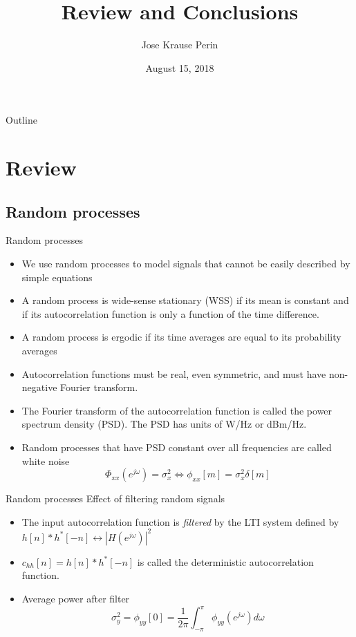 \documentclass[10pt, aspectratio=169]{beamer}
\title[EE 264]{Review and Conclusions}
\author{Jose Krause Perin}
\institute{Stanford University}
\date{August 15, 2018}
\begin{document}
\begin{frame}
  \titlepage
\end{frame}

%
\begin{frame}{Outline}
	\tableofcontents
\end{frame}

%
\section{Review}
\subsection{Random processes}
\begin{frame}{Random processes}
\begin{itemize}
	\item We use random processes to model signals that cannot be easily described by simple equations
	\item A random process is wide-sense stationary (WSS) if its mean is constant and if its autocorrelation function is only a function of the time difference. 
	\item A random process is ergodic if its time averages are equal to its probability averages
	\item Autocorrelation functions must be real, even symmetric, and must have non-negative Fourier transform.
	\item The Fourier transform of the autocorrelation function is called the power spectrum density (PSD). The PSD has units of W/Hz or dBm/Hz.
	\item Random processes that have PSD constant over all frequencies are called white noise
	\begin{equation*}
		\Phi_{xx}(e^{j\omega}) = \sigma_x^2 \Longleftrightarrow \phi_{xx}[m] = \sigma_x^2\delta[m] \tag{white noise}
	\end{equation*}
\end{itemize}
\end{frame}

%
\begin{frame}{Random processes}
Effect of filtering random signals
\begin{center}
	\resizebox{0.5\linewidth}{!}{}
\end{center}

\begin{itemize}
	\item The input autocorrelation function is \textit{filtered} by the LTI system defined by $h[n]\ast h^*[-n] \leftrightarrow |H(e^{j\omega})|^2$
	\item $c_{hh}[n] = h[n]\ast h^*[-n]$ is called the deterministic autocorrelation function.
	\item Average power after filter
	\begin{equation*}
		\sigma^2_y = \phi_{yy}[0] = \frac{1}{2\pi}\int_{-\pi}^{\pi} \phi_{yy}(e^{j\omega}) d\omega
	\end{equation*}
\end{itemize}
\end{frame}
\end{document}
